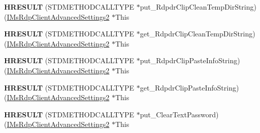 \begin{DoxyCompactItemize}
\item 
\mbox{\label{struct_m_s_t_s_c_lib_1_1_i_ms_rdp_client_advanced_settings2_vtbl_ae2c0a160e149312accf2622b00e9c88d}} 
{\bfseries H\+R\+E\+S\+U\+LT} (S\+T\+D\+M\+E\+T\+H\+O\+D\+C\+A\+L\+L\+T\+Y\+PE $\ast$put\+\_\+\+Rdpdr\+Clip\+Clean\+Temp\+Dir\+String)(\hyperlink{interface_m_s_t_s_c_lib_1_1_i_ms_rdp_client_advanced_settings2}{I\+Ms\+Rdp\+Client\+Advanced\+Settings2} $\ast$This
\item 
\mbox{\label{struct_m_s_t_s_c_lib_1_1_i_ms_rdp_client_advanced_settings2_vtbl_a77a0de07cf892b6427837c51d7ed604d}} 
{\bfseries H\+R\+E\+S\+U\+LT} (S\+T\+D\+M\+E\+T\+H\+O\+D\+C\+A\+L\+L\+T\+Y\+PE $\ast$get\+\_\+\+Rdpdr\+Clip\+Clean\+Temp\+Dir\+String)(\hyperlink{interface_m_s_t_s_c_lib_1_1_i_ms_rdp_client_advanced_settings2}{I\+Ms\+Rdp\+Client\+Advanced\+Settings2} $\ast$This
\item 
\mbox{\label{struct_m_s_t_s_c_lib_1_1_i_ms_rdp_client_advanced_settings2_vtbl_aec7a90f15322a82c47357f80893d0c9b}} 
{\bfseries H\+R\+E\+S\+U\+LT} (S\+T\+D\+M\+E\+T\+H\+O\+D\+C\+A\+L\+L\+T\+Y\+PE $\ast$put\+\_\+\+Rdpdr\+Clip\+Paste\+Info\+String)(\hyperlink{interface_m_s_t_s_c_lib_1_1_i_ms_rdp_client_advanced_settings2}{I\+Ms\+Rdp\+Client\+Advanced\+Settings2} $\ast$This
\item 
\mbox{\label{struct_m_s_t_s_c_lib_1_1_i_ms_rdp_client_advanced_settings2_vtbl_af1c92a4c5d82080b54ed01346b7ff435}} 
{\bfseries H\+R\+E\+S\+U\+LT} (S\+T\+D\+M\+E\+T\+H\+O\+D\+C\+A\+L\+L\+T\+Y\+PE $\ast$get\+\_\+\+Rdpdr\+Clip\+Paste\+Info\+String)(\hyperlink{interface_m_s_t_s_c_lib_1_1_i_ms_rdp_client_advanced_settings2}{I\+Ms\+Rdp\+Client\+Advanced\+Settings2} $\ast$This
\item 
\mbox{\label{struct_m_s_t_s_c_lib_1_1_i_ms_rdp_client_advanced_settings2_vtbl_af4efb1346d7f13c1efe6759424ca7e93}} 
{\bfseries H\+R\+E\+S\+U\+LT} (S\+T\+D\+M\+E\+T\+H\+O\+D\+C\+A\+L\+L\+T\+Y\+PE $\ast$put\+\_\+\+Clear\+Text\+Password)(\hyperlink{interface_m_s_t_s_c_lib_1_1_i_ms_rdp_client_advanced_settings2}{I\+Ms\+Rdp\+Client\+Advanced\+Settings2} $\ast$This

\end{DoxyCompactItemize}
